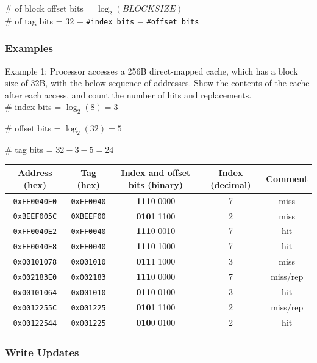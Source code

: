 \documentclass[12pt]{extarticle}
\begin{document}
	\# of block offset bits = $\log_2(BLOCKSIZE)$ \\

	\# of tag bits = 32 $-$ \texttt{\#index bits} $-$ \texttt{\#offset bits}

	\subsubsection{Examples}

	Example 1: Processor accesses a 256B direct-mapped cache, which has a block size of 32B, with the below sequence 
	of addresses. Show the contents of the cache after each access, and count the number of hits and replacements. \\

	\# index bits = $\log_2(8) = 3$

	\# offset bits = $\log_2(32) = 5$

	\# tag bits = $32 - 3 - 5 = 24$ \\

	\begin{tabular}[ht!]{|c|c|c|c|c|} \hline
		Address (hex)		& Tag (hex) 		& Index and offset bits (binary)	& Index (decimal)	& Comment	\\ \hline
		\texttt{0xFF0040E0}	& \texttt{0xFF0040}	& \textbf{111}0 0000				& 7					& miss	  	\\ \hline	
		\texttt{0xBEEF005C}	& \texttt{0XBEEF00}	& \textbf{010}1 1100				& 2					& miss		\\ \hline
		\texttt{0xFF0040E2}	& \texttt{0xFF0040}	& \textbf{111}0 0010				& 7					& hit		\\ \hline
		\texttt{0xFF0040E8}	& \texttt{0xFF0040}	& \textbf{111}0 1000				& 7					& hit		\\ \hline
		\texttt{0x00101078}	& \texttt{0x001010}	& \textbf{011}1 1000				& 3					& miss		\\ \hline
		\texttt{0x002183E0}	& \texttt{0x002183}	& \textbf{111}0 0000				& 7					& miss/rep	\\ \hline
		\texttt{0x00101064}	& \texttt{0x001010}	& \textbf{011}0 0100				& 3					& hit		\\ \hline
		\texttt{0x0012255C}	& \texttt{0x001225}	& \textbf{010}1 1100				& 2					& miss/rep	\\ \hline
		\texttt{0x00122544}	& \texttt{0x001225}	& \textbf{010}0 0100				& 2					& hit		\\ \hline
	\end{tabular}

	\subsubsection{Write Updates}
\end{document}
